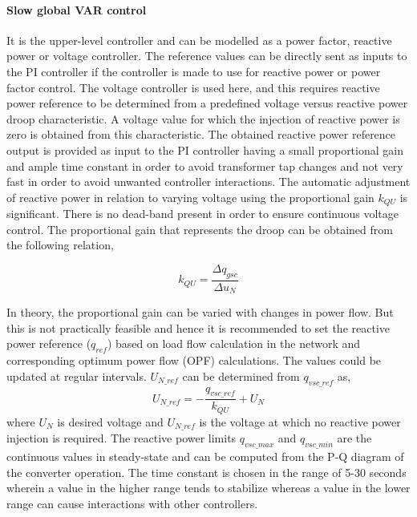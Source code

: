 \paragraph{Slow global VAR control}
It is the upper-level controller and can be modelled as a power factor, reactive power or voltage controller. The reference values can be directly sent as inputs to the PI controller if the controller is made to use for reactive power or power factor control. The voltage controller is used here, and this requires reactive power reference to be determined from a predefined voltage versus reactive power droop characteristic. A voltage value for which the injection of reactive power is zero is obtained from this characteristic. The obtained reactive power reference output is provided as input to the PI controller having a small proportional gain and ample time constant in order to avoid transformer tap changes and not very fast in order to avoid unwanted controller interactions. The automatic adjustment of reactive power in relation to varying voltage using the proportional gain $k_{QU}$ is significant. There is no dead-band present in order to ensure continuous voltage control. The  proportional gain that represents the droop can be obtained from the following relation,

\begin{equation}
    k_{QU} = \frac{\Delta q_{gsc}}{\Delta u_N}
\end{equation}

In theory, the proportional gain can be varied with changes in power flow. But this is not practically feasible and hence it is recommended to set the reactive power reference ($q_{ref}$) based on load flow calculation in the network and corresponding optimum power flow (OPF) calculations. The values could be updated at regular intervals. $U_{N\_{ref}}$ can be determined from $q_{vsc\_ref}$ as,
\begin{equation}
    U_{N\_{ref}} = -\frac{q_{vsc\_ref}}{k_{QU}} + U_N
\end{equation}
where $U_N$ is desired voltage and $U_{N\_{ref}}$ is the voltage at which no reactive power injection is required.
The reactive power limits $q_{vsc\_max}$ and $q_{vsc\_min}$ are the continuous values in steady-state and can be computed from the P-Q diagram of the converter operation. The time constant is chosen in the range of 5-30 seconds wherein a value in the higher range tends to stabilize whereas a value in the lower range can cause interactions with other controllers.

